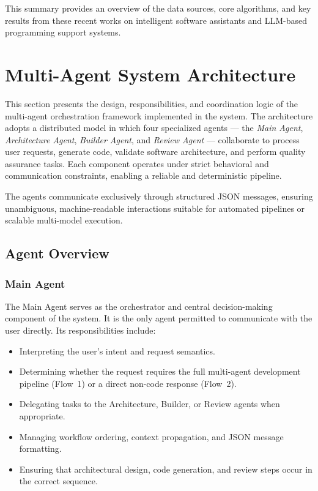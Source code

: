 \documentclass[12pt,a4paper]{article}
\begin{document}
This summary provides an overview of the data sources, core algorithms, and key results from these recent works on 
intelligent software assistants and LLM-based programming support systems.

\section{Multi-Agent System Architecture}

This section presents the design, responsibilities, and coordination logic of the multi-agent orchestration framework implemented in the system. The architecture adopts a distributed model in which four specialized agents --- the \textit{Main Agent}, \textit{Architecture Agent}, \textit{Builder Agent}, and \textit{Review Agent} --- collaborate to process user requests, generate code, validate software architecture, and perform quality assurance tasks. Each component operates under strict behavioral and communication constraints, enabling a reliable and deterministic pipeline.

The agents communicate exclusively through structured JSON messages, ensuring unambiguous, machine-readable interactions suitable for automated pipelines or scalable multi-model execution.

\subsection{Agent Overview}
\subsubsection{Main Agent}

The Main Agent serves as the orchestrator and central decision-making component of the system. It is the only agent permitted to communicate with the user directly. Its responsibilities include:

\begin{itemize}
    \item Interpreting the user's intent and request semantics.
    \item Determining whether the request requires the full multi-agent development pipeline (Flow~1) or a direct non-code response (Flow~2).
    \item Delegating tasks to the Architecture, Builder, or Review agents when appropriate.
    \item Managing workflow ordering, context propagation, and JSON message formatting.
    \item Ensuring that architectural design, code generation, and review steps occur in the correct sequence.
\end{itemize}
\end{document}
